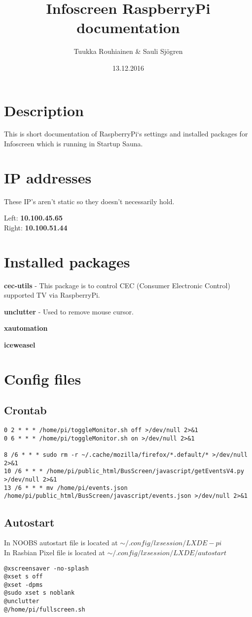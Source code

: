 \documentclass{article}
\title{Infoscreen RaspberryPi documentation}
\author{Tuukka Rouhiainen \& Sauli Sjögren}
\begin{document}
\date{13.12.2016}
\maketitle
\thispagestyle{fancy}

\section{Description}
This is short documentation of RaspberryPi`s settings and installed packages for Infoscreen which is running in Startup Sauna.
\section{IP addresses}
These IP's aren't static so they doesn't necessarily hold.

Left: \textbf{10.100.45.65} \\
Right: \textbf{10.100.51.44}
\section{Installed packages}
\textbf{cec-utils} - This package is to control CEC (Consumer Electronic Control) supported TV via RaspberryPi.

\textbf{unclutter} - Used to remove mouse cursor.

\textbf{xautomation}

\textbf{iceweasel}
\section{Config files}
\subsection{Crontab}
\begin{verbatim}
0 2 * * * /home/pi/toggleMonitor.sh off >/dev/null 2>&1
0 6 * * * /home/pi/toggleMonitor.sh on >/dev/null 2>&1

8 /6 * * * sudo rm -r ~/.cache/mozilla/firefox/*.default/* >/dev/null 2>&1
10 /6 * * * /home/pi/public_html/BusScreen/javascript/getEventsV4.py >/dev/null 2>&1
13 /6 * * * mv /home/pi/events.json /home/pi/public_html/BusScreen/javascript/events.json >/dev/null 2>&1
\end{verbatim}
\subsection{Autostart}
In NOOBS autostart file is located at $\sim/.config/lxsession/LXDE-pi$ \\
In Rasbian Pixel file is located at $\sim/.config/lxsession/LXDE/autostart$
\begin{verbatim}
@xscreensaver -no-splash
@xset s off
@xset -dpms
@sudo xset s noblank
@unclutter
@/home/pi/fullscreen.sh
\end{verbatim}
\end{document}
